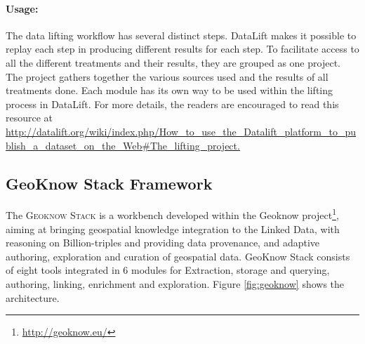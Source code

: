 \paragraph{Usage:}
The data lifting workflow has several distinct steps. DataLift makes it possible to replay each step in producing different results for each step. To facilitate access to all the different treatments and their results, they are grouped as one project. The project gathers together the various sources used and the results of all treatments done.
Each module has its own way to be used within the lifting process in DataLift. For more details, the readers are encouraged to read this resource at \url{http://datalift.org/wiki/index.php/How_to_use_the_Datalift_platform_to_publish_a_dataset_on_the_Web#The_lifting_project.
}



\subsection{GeoKnow Stack Framework}
\label{sec:geoknow}

The \textsc{Geoknow Stack} is a workbench developed within the Geoknow project\footnote{\url{http://geoknow.eu/}}, aiming at bringing geospatial knowledge integration to the Linked Data, with reasoning on Billion-triples and providing data provenance, and adaptive authoring, exploration and curation of geospatial data. GeoKnow Stack consists of eight tools integrated in 6 modules for Extraction, storage and querying, authoring, linking, enrichment and exploration. Figure \ref{fig:geoknow} shows the architecture.

